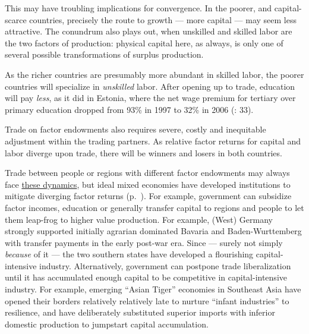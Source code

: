 This may have troubling implications for convergence. In the poorer, and capital-scarce countries, precisely the route to growth --- more capital --- may seem less attractive. The conundrum also plays out, when unskilled and skilled labor are the two factors of production: physical capital here, as always, is only one of several possible transformations of surplus production.

As the richer countries are presumably more abundant in skilled labor, the poorer countries will specialize in \emph{unskilled} labor. After opening up to trade, education will pay \emph{less}, as it did in Estonia, where the net wage premium for tertiary over primary education dropped from 93\% in 1997 to 32\% in 2006 (\citealt{Piatkowski2008}: 33).


Trade on factor endowments also requires severe, costly and inequitable adjustment within the trading partners. As relative factor returns for capital and labor diverge upon trade, there will be winners and losers in both countries.

Trade between people or regions with different factor endowments may always face \hyperref[sec:space]{these dynamics}, but ideal mixed economies have developed institutions to mitigate diverging factor returns (p.~\pageref{sec:space}). For example, government can subsidize factor incomes, education or generally transfer capital to regions and people to let them leap-frog to higher value production. For example, (West) Germany strongly supported initially agrarian dominated Bavaria and Baden-Wurttemberg with transfer payments in the early post-war era. Since --- surely not simply \emph{because} of it --- the two southern states have developed a flourishing capital-intensive industry. Alternatively, government can postpone trade liberalization until it has accumulated enough capital to be competitive in capital-intensive industry. For example, emerging ``Asian Tiger'' economies in Southeast Asia have opened their borders relatively relatively late to nurture ``infant industries'' to resilience, and have deliberately substituted superior imports with inferior domestic production to jumpstart capital accumulation.

